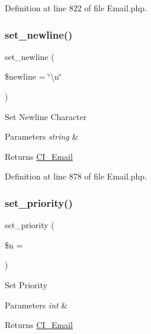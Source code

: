 Definition at line 822 of file Email.\+php.

\mbox{\label{class_c_i___email_a095be9606f6f063ee6e1af81b53d405e}} 
\subsubsection{\texorpdfstring{set\_newline()}{set\_newline()}}
{\footnotesize\ttfamily set\+\_\+newline (\begin{DoxyParamCaption}\item[{}]{\$newline = {\ttfamily \char`\"{}\textbackslash{}n\char`\"{}} }\end{DoxyParamCaption})}

Set Newline Character


\begin{DoxyParams}{Parameters}
{\em string} & \\
\hline
\end{DoxyParams}
\begin{DoxyReturn}{Returns}
\mbox{\hyperlink{class_c_i___email}{C\+I\+\_\+\+Email}} 
\end{DoxyReturn}


Definition at line 878 of file Email.\+php.

\mbox{\label{class_c_i___email_aee3ae37c0bf5f8aca34f6e872efd66b8}} 
\subsubsection{\texorpdfstring{set\_priority()}{set\_priority()}}
{\footnotesize\ttfamily set\+\_\+priority (\begin{DoxyParamCaption}\item[{}]{\$n = {} }\end{DoxyParamCaption})}

Set Priority


\begin{DoxyParams}{Parameters}
{\em int} & \\
\hline
\end{DoxyParams}
\begin{DoxyReturn}{Returns}
\mbox{\hyperlink{class_c_i___email}{C\+I\+\_\+\+Email}} 
\end{DoxyReturn}


